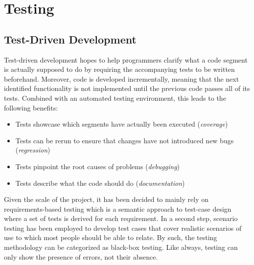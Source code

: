 
\chapter{Testing}
\label{chp:testing}

\section{Test-Driven Development}
Test-driven development hopes to help programmers clarify what a code segment is actually supposed to do by requiring the accompanying tests to be written beforehand. Moreover, code is developed incrementally, meaning that the next identified functionality is not implemented until the previous code passes all of its tests. Combined with an automated testing environment, this leads to the following benefits:

\begin{itemize}
  \item Tests showcase which segments have actually been executed (\textit{coverage})
  \item Tests can be rerun to ensure that changes have not introduced new bugs (\textit{regression})
  \item Tests pinpoint the root causes of problems (\textit{debugging})
  \item Tests describe what the code should do (\textit{documentation})
\end{itemize}

Given the scale of the project, it has been decided to mainly rely on requirements-based testing which is a semantic approach to test-case design where a set of tests is derived for each requirement. In a second step, scenario testing has been employed to develop test cases that cover realistic scenarios of use to which most people should be able to relate. By such, the testing methodology can be categorized as black-box testing. Like always, testing can only show the presence of errors, not their absence. 


